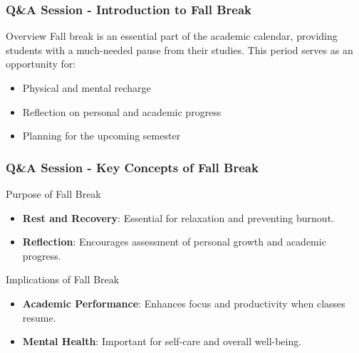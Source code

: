\documentclass[aspectratio=169]{beamer}
\begin{document}
\begin{frame}[fragile]
    \frametitle{Q\&A Session - Introduction to Fall Break}
    \begin{block}{Overview}
        Fall break is an essential part of the academic calendar, providing students with a much-needed pause from their studies. This period serves as an opportunity for:
        \begin{itemize}
            \item Physical and mental recharge
            \item Reflection on personal and academic progress
            \item Planning for the upcoming semester
        \end{itemize}
    \end{block}
\end{frame}

\begin{frame}[fragile]
    \frametitle{Q\&A Session - Key Concepts of Fall Break}
    \begin{block}{Purpose of Fall Break}
        \begin{itemize}
            \item \textbf{Rest and Recovery}: Essential for relaxation and preventing burnout.
            \item \textbf{Reflection}: Encourages assessment of personal growth and academic progress.
        \end{itemize}
    \end{block}
    
    \begin{block}{Implications of Fall Break}
        \begin{itemize}
            \item \textbf{Academic Performance}: Enhances focus and productivity when classes resume.
            \item \textbf{Mental Health}: Important for self-care and overall well-being.
        \end{itemize}
    \end{block}
\end{frame}
\end{document}
